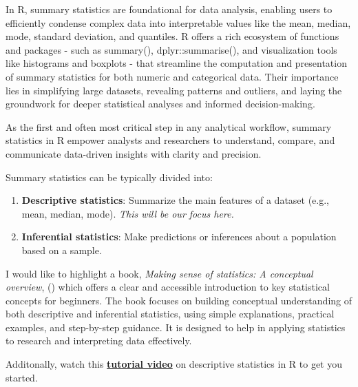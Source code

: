 \documentclass[
  man,
  floatsintext,
  longtable,
  nolmodern,
  notxfonts,
  notimes,
  colorlinks=true,linkcolor=blue,citecolor=blue,urlcolor=blue]{apa7}
\begin{document}
In R, summary statistics are foundational for data analysis, enabling
users to efficiently condense complex data into interpretable values
like the mean, median, mode, standard deviation, and quantiles. R offers
a rich ecosystem of functions and packages - such as summary(),
dplyr::summarise(), and visualization tools like histograms and boxplots
- that streamline the computation and presentation of summary statistics
for both numeric and categorical data. Their importance lies in
simplifying large datasets, revealing patterns and outliers, and laying
the groundwork for deeper statistical analyses and informed
decision-making.

As the first and often most critical step in any analytical workflow,
summary statistics in R empower analysts and researchers to understand,
compare, and communicate data-driven insights with clarity and
precision.

Summary statistics can be typically divided into:

\begin{enumerate}
\def\labelenumi{\arabic{enumi}.}
\item
  \textbf{Descriptive statistics}: Summarize the main features of a
  dataset (e.g., mean, median, mode). \emph{This will be our focus
  here.}
\item
  \textbf{Inferential statistics}: Make predictions or inferences about
  a population based on a sample.
\end{enumerate}

I would like to highlight a book, \emph{Making sense of statistics: A
conceptual overview}, ()
which offers a clear and accessible introduction to key statistical
concepts for beginners. The book focuses on building conceptual
understanding of both descriptive and inferential statistics, using
simple explanations, practical examples, and step-by-step guidance. It
is designed to help in applying statistics to research and interpreting
data effectively.

Additonally, watch this
\href{https://www.youtube.com/watch?v=yoPGwvUzjgQ}{\textbf{tutorial
video}} on descriptive statistics in R to get you started.
\end{document}
